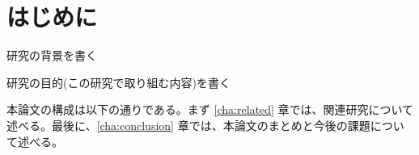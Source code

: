 \documentclass[main]{subfiles}
\begin{document}
\chapter{はじめに}
\label{cha:intro}

研究の背景を書く

研究の目的(この研究で取り組む内容)を書く

本論文の構成は以下の通りである。まず \ref{cha:related} 章では、関連研究について述べる。最後に、\ref{cha:conclusion} 章では、本論文のまとめと今後の課題について述べる。
\end{document}
